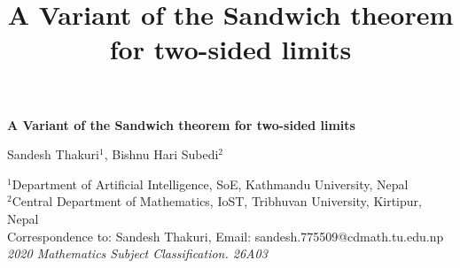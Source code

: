 \documentclass[a4paper,twoside,12pt]{article}
\title{\bfseries A Variant of the Sandwich theorem for two-sided limits}
\theoremstyle{plain}
\theoremstyle{definition}
\theoremstyle{theorem}
\begin{document}
\linenumbers
\vspace{2mm}
{\Large
\begin{center}
\bf{\LARGE \bfseries A Variant of the Sandwich theorem for two-sided limits}
\end{center}}
\begin{center}
Sandesh Thakuri$^{1}$, Bishnu Hari Subedi$^{2}$
\end{center}

\begin{center}
{\footnotesize
  $^{1}$Department of Artificial Intelligence, SoE, Kathmandu University, Nepal \\[1mm]
 \(^{2}\)Central Department of Mathematics, IoST, Tribhuvan University, Kirtipur, Nepal \\[2mm]
 Correspondence to: Sandesh Thakuri, Email: sandesh.775509@cdmath.tu.edu.np \\[1mm]
\textit{2020 Mathematics Subject Classification. 26A03}
}
\end{center}
\end{document}
